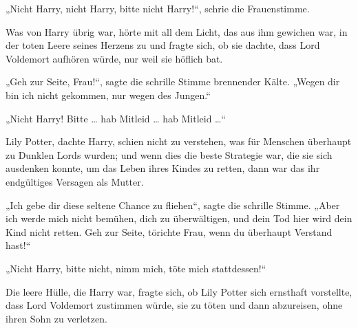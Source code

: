 \begin{em}
„Nicht Harry, nicht Harry, bitte nicht Harry!“, schrie die Frauenstimme.

Was von Harry übrig war, hörte mit all dem Licht, das aus ihm gewichen war, in der toten Leere seines Herzens zu und fragte sich, ob sie dachte, dass Lord Voldemort aufhören würde, nur weil sie höflich bat.

„Geh zur Seite, Frau!“, sagte die schrille Stimme brennender Kälte.
„Wegen dir bin ich nicht gekommen, nur wegen des Jungen.“

„Nicht Harry! Bitte … hab Mitleid … hab Mitleid …“

Lily Potter, dachte Harry, schien nicht zu verstehen, was für Menschen überhaupt zu Dunklen Lords wurden; und wenn dies die beste Strategie war, die sie sich ausdenken konnte, um das Leben ihres Kindes zu retten, dann war das ihr endgültiges Versagen als Mutter.

„Ich gebe dir diese seltene Chance zu fliehen“, sagte die schrille Stimme.
„Aber ich werde mich nicht bemühen, dich zu überwältigen, und dein Tod hier wird dein Kind nicht retten. Geh zur Seite, törichte Frau, wenn du überhaupt Verstand hast!“

„Nicht Harry, bitte nicht, nimm mich, töte mich stattdessen!“

Die leere Hülle, die Harry war, fragte sich, ob Lily Potter sich ernsthaft vorstellte, dass Lord Voldemort zustimmen würde, sie zu töten und dann abzureisen, ohne ihren Sohn zu verletzen.


\end{em}

